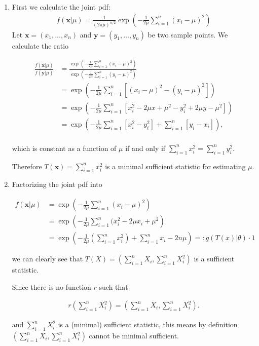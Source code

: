 \begin{solution}

  \phantom{}

  \begin{enumerate}[label = (\alph*)]
    \item 
    First we calculate the joint pdf:
    \begin{align*}
      f(\textbf{x}|\mu) = \frac{1}{(2\pi\mu)^{n/2}}
      \exp\left(-\frac{1}{2\mu}\sum_{i=1}^n(x_i - \mu)^2\right)
    \end{align*}
    Let $\textbf{x} = (x_1,\dots,x_n)$ and $\textbf{y} = (y_1,\dots,y_n)$ 
    be two sample points. We calculate the ratio

    \begin{align*}
      \frac{f(\textbf{x}|\mu)}{f(\textbf{y}|\mu)}
      &= \frac{\exp\left(-\frac{1}{2\mu}\sum_{i=1}^n(x_i - \mu)^2\right)}
            {\exp\left(-\frac{1}{2\mu}\sum_{i=1}^n(y_i - \mu)^2\right)} \\
      &= \exp\left(-\frac{1}{2\mu}\sum_{i=1}^n[(x_i - \mu)^2 - (y_i - \mu)^2]\right) \\
      &= \exp\left(-\frac{1}{2\mu}\sum_{i=1}^n [x_i^2 - 2\mu x + \mu^2 - y_i^2 + 2\mu y - \mu^2]\right) \\
      &= \exp\left(-\frac{1}{2\mu}\sum_{i=1}^n [x_i^2 - y_i^2] + \sum_{i=1}^n [y_i - x_i]\right), \\
    \end{align*}

    which is constant as a function of $\mu$ if and only if $\sum_{i=1}^n x_i^2 = \sum_{i=1}^n y_i^2$.

    Therefore $T(\textbf{x}) = \sum_{i=1}^n x_i^2$ is a minimal sufficient statistic for estimating $\mu$.

    \item Factorizing the joint pdf into
    
    \begin{align*}
      f(\textbf{x}|\mu) &= \exp\left(-\frac{1}{2\mu}\sum_{i=1}^n(x_i - \mu)^2\right) \\
      &= \exp\left(-\frac{1}{2\mu}\sum_{i=1}^n(x_i^2 - 2\mu x_i + \mu^2\right) \\
      &= \exp\left(-\frac{1}{2\mu}\left(\sum_{i=1}^n x_i^2\right) + \sum_{i=1}^n x_i - 2n\mu\right) =: g(T(x)|\theta) \cdot 1
    \end{align*}
    
    we can clearly see that $T(X) = \left(\sum_{i=1}^n X_i, \sum_{i=1}^n X_i^2\right)$ is a sufficient statistic.
    
    Since there is no function $r$ such that 

    \begin{align*}
      r\left(\sum_{i=1}^n X_i^2\right) = \left(\sum_{i=1}^n X_i, \sum_{i=1}^n X_i^2\right).
    \end{align*}

    and $\sum_{i=1}^n X_i^2$ is a (minimal) sufficient statistic, this means by definition
    $\left(\sum_{i=1}^n X_i, \sum_{i=1}^n X_i^2\right)$ cannot be minimal sufficient.
  \end{enumerate}

\end{solution}

